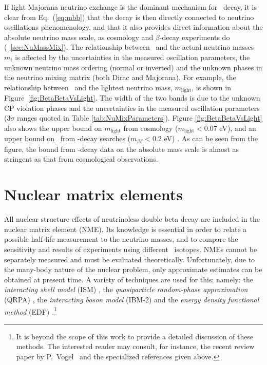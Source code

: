 \documentclass{PoS}
\begin{document}
If light Majorana neutrino exchange is the dominant mechanism for \bbonu\ decay, it is clear from Eq.~(\ref{eq:mbb}) that the decay is then directly connected to neutrino oscillations phenomenology, and that it also provides direct information about the absolute neutrino mass scale, as cosmology and $\beta$-decay experiments do (\textsection~\ref{sec:NuMassMix}). The relationship between \mbb\ and the actual neutrino masses $m_i$ is affected by the uncertainties in the measured oscillation parameters, the unknown neutrino mass ordering (normal or inverted) and the unknown phases in the neutrino mixing matrix (both Dirac and Majorana). For example, the relationship between \mbb\ and the lightest neutrino mass, $m_\mathrm{light}$, is shown in Figure~\ref{fig:BetaBetaVsLight}. The width of the two bands is due to the unknown CP violation phases and the uncertainties in the measured oscillation parameters (3$\sigma$ ranges quoted in Table \ref{tab:NuMixParameters}). Figure \ref{fig:BetaBetaVsLight} also shows the upper bound on $m_\mathrm{light}$ from cosmology ($m_\mathrm{light}<0.07$ eV), and an upper bound on \mbb\ from \bbonu-decay searches ($m_{\beta\beta}<0.2$ eV) \cite{Albert:2014awa, Asakura:2014lma}. As can be seen from the figure, the bound from \bbonu-decay data on the absolute mass scale is almost as stringent as that from cosmological observations.

\section{Nuclear matrix elements} \label{sec:NME}
All nuclear structure effects of neutrinoless double beta decay are included in the nuclear matrix element (NME). Its knowledge is essential in order to relate a possible half-life measurement to the neutrino masses, and to compare the sensitivity and results of experiments using different \bb\ isotopes. NMEs cannot be separately measured and must be evaluated theoretically. Unfortunately, due to the many-body nature of the nuclear problem, only approximate estimates can be obtained at present time. A variety of techniques are used for this; namely: the \emph{interacting shell model} (ISM) \cite{Caurier:2007wq, Menendez:2008jp}, the \emph{quasiparticle random-phase approximation} (QRPA) \cite{Rodin:2007fz, Kortelainen:2007rn}, the \emph{interacting boson model} (IBM-2) \cite{Barea:2013bz} and the \emph{energy density functional method} (EDF) \cite{Rodriguez:2010mn, Vaquero:2014dna}.\footnote{It is beyond the scope of this work to provide a detailed discussion of these methods. The interested reader may consult, for instance, the recent review paper by P.~Vogel~\cite{Vogel:2012ja} and the specialized references given above.}
\end{document}
